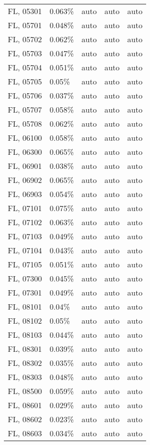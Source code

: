 \begin{longtable}[]{@{}lllll@{}}
FL, 05301 & 0.063\% & auto & auto & auto \\
FL, 05701 & 0.048\% & auto & auto & auto \\
FL, 05702 & 0.062\% & auto & auto & auto \\
FL, 05703 & 0.047\% & auto & auto & auto \\
FL, 05704 & 0.051\% & auto & auto & auto \\
FL, 05705 & 0.05\% & auto & auto & auto \\
FL, 05706 & 0.037\% & auto & auto & auto \\
FL, 05707 & 0.058\% & auto & auto & auto \\
FL, 05708 & 0.062\% & auto & auto & auto \\
FL, 06100 & 0.058\% & auto & auto & auto \\
FL, 06300 & 0.065\% & auto & auto & auto \\
FL, 06901 & 0.038\% & auto & auto & auto \\
FL, 06902 & 0.065\% & auto & auto & auto \\
FL, 06903 & 0.054\% & auto & auto & auto \\
FL, 07101 & 0.075\% & auto & auto & auto \\
FL, 07102 & 0.063\% & auto & auto & auto \\
FL, 07103 & 0.049\% & auto & auto & auto \\
FL, 07104 & 0.043\% & auto & auto & auto \\
FL, 07105 & 0.051\% & auto & auto & auto \\
FL, 07300 & 0.045\% & auto & auto & auto \\
FL, 07301 & 0.049\% & auto & auto & auto \\
FL, 08101 & 0.04\% & auto & auto & auto \\
FL, 08102 & 0.05\% & auto & auto & auto \\
FL, 08103 & 0.044\% & auto & auto & auto \\
FL, 08301 & 0.039\% & auto & auto & auto \\
FL, 08302 & 0.035\% & auto & auto & auto \\
FL, 08303 & 0.048\% & auto & auto & auto \\
FL, 08500 & 0.059\% & auto & auto & auto \\
FL, 08601 & 0.029\% & auto & auto & auto \\
FL, 08602 & 0.023\% & auto & auto & auto \\
FL, 08603 & 0.034\% & auto & auto & auto \\

\end{longtable}
